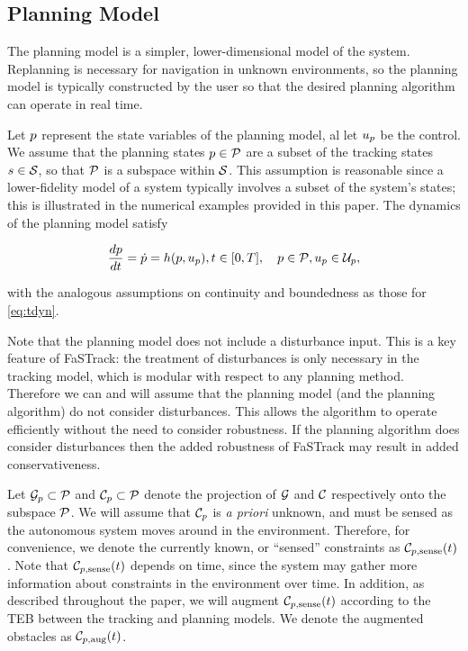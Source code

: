 \subsection{Planning Model \label{sec:planning_model}}
The planning model is a simpler, lower-dimensional model of the system.
Replanning is necessary for navigation in unknown environments, so the planning model is typically constructed by the user so that the desired planning algorithm can operate in real time.

Let $p$ represent the state variables of the planning model, al let $u_p$ be the control. 
We assume that the planning states $p \in \mathcal{P}$ are a subset of the tracking states $s \in \mathcal{S}$, so that $\mathcal{P}$ is a subspace within $\mathcal{S}$.
This assumption is reasonable since a lower-fidelity model of a system typically involves a subset of the system's states; this is illustrated in the numerical examples provided in this paper.
The dynamics of the planning model satisfy

\begin{align}
\label{eq:pdyn}
\frac{d\pstate}{d\tvar} = \dot{\pstate} = \pdyn(\pstate, \pctrl), \tvar \in [0, \thor], \quad \pstate \in \pset, \pctrl \in \pcset,
\end{align}

\noindent with the analogous assumptions on continuity and boundedness as those for \eqref{eq:tdyn}.

Note that the planning model does not include a disturbance input. 
This is a key feature of FaSTrack: the treatment of disturbances is only necessary in the tracking model, which is modular with respect to any planning method. Therefore we can and will assume that the planning model (and the planning algorithm) do not consider disturbances. This allows the algorithm to operate efficiently without the need to consider robustness. If the planning algorithm does consider disturbances then the added robustness of FaSTrack may result in added conservativeness.

Let $\mathcal G_p \subset \mathcal{P}$ and $\mathcal C_p \subset \mathcal{P}$ denote the projection of $\mathcal G$ and $\mathcal C$ respectively onto the subspace $\mathcal{P}$.
We will assume that $\mathcal C_p$ is \textit{a priori} unknown, and must be sensed as the autonomous system moves around in the environment.
Therefore, for convenience, we denote the currently known, or ``sensed'' constraints as $\mathcal C_{p,\text{sense}}(t)$.
Note that $\mathcal C_{p,\text{sense}}(t)$ depends on time, since the system may gather more information about constraints in the environment over time.
In addition, as described throughout the paper, we will augment $\mathcal C_{p,\text{sense}}(t)$ according to the TEB between the tracking and planning models.
We denote the augmented obstacles as $\mathcal C_{p,\text{aug}}(t)$.

